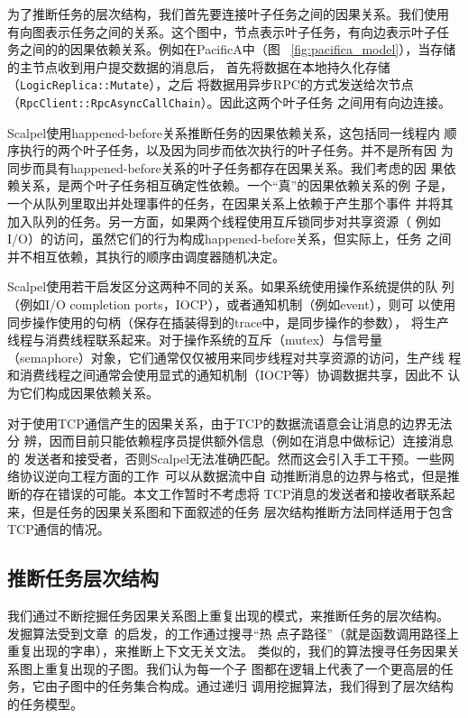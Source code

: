 
为了推断任务的层次结构，我们首先要连接叶子任务之间的因果关系。我们使用
有向图表示任务之间的关系。这个图中，节点表示叶子任务，有向边表示叶子任
务之间的的因果依赖关系。例如在PacificA中（图
~\ref{fig:pacifica_model}），当存储的主节点收到用户提交数据的消息后，
首先将数据在本地持久化存储（\texttt{Logic\-Replica\-::Mutate}），之后
将数据用异步RPC的方式发送给次节点
（\texttt{Rpc\-Client\-::RpcAsync\-Call\-Chain}）。因此这两个叶子任务
之间用有向边连接。

Scalpel使用happened-before关系推断任务的因果依赖关系，这包括同一线程内
顺序执行的两个叶子任务，以及因为同步而依次执行的叶子任务。并不是所有因
为同步而具有happened-before关系的叶子任务都存在因果关系。我们考虑的因
果依赖关系，是两个叶子任务相互确定性依赖。一个“真”的因果依赖关系的例
子是，一个从队列里取出并处理事件的任务，在因果关系上依赖于产生那个事件
并将其加入队列的任务。另一方面，如果两个线程使用互斥锁同步对共享资源（
例如I/O）的访问，虽然它们的行为构成happened-before关系，但实际上，任务
之间并不相互依赖，其执行的顺序由调度器随机决定。

Scalpel使用若干启发区分这两种不同的关系。如果系统使用操作系统提供的队
列（例如I/O completion ports，IOCP），或者通知机制（例如event），则可
以使用同步操作使用的句柄（保存在插装得到的trace中，是同步操作的参数），
将生产线程与消费线程联系起来。对于操作系统的互斥（mutex）与信号量
（semaphore）对象，它们通常仅仅被用来同步线程对共享资源的访问，生产线
程和消费线程之间通常会使用显式的通知机制（IOCP等）协调数据共享，因此不
认为它们构成因果依赖关系。

对于使用TCP通信产生的因果关系，由于TCP的数据流语意会让消息的边界无法分
辨，因而目前只能依赖程序员提供额外信息（例如在消息中做标记）连接消息的
发送者和接受者，否则Scalpel无法准确匹配。然而这会引入手工干预。一些网
络协议逆向工程方面的工作~\cite{Caballero2007, Cui2007}可以从数据流中自
动推断消息的边界与格式，但是推断的存在错误的可能。本文工作暂时不考虑将
TCP消息的发送者和接收者联系起来，但是任务的因果关系图和下面叙述的任务
层次结构推断方法同样适用于包含TCP通信的情况。

\subsection{推断任务层次结构}

我们通过不断挖掘任务因果关系图上重复出现的模式，来推断任务的层次结构。
发掘算法受到文章~\cite{wpp}的启发，的工作通过搜寻“热
点子路径”（就是函数调用路径上重复出现的字串），来推断上下文无关文法。
类似的，我们的算法搜寻任务因果关系图上重复出现的子图。我们认为每一个子
图都在逻辑上代表了一个更高层的任务，它由子图中的任务集合构成。通过递归
调用挖掘算法，我们得到了层次结构的任务模型。


